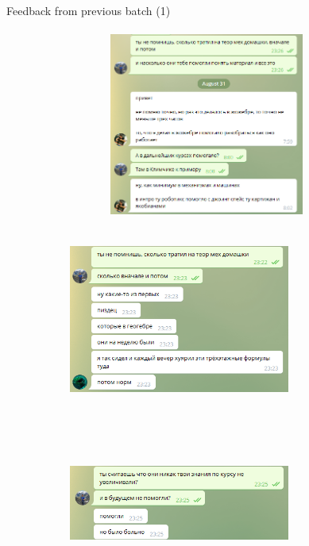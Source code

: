 \documentclass[aspectratio=169,xcolor=table,10pt, notes=hide]{beamer}
\begin{document}
\begin{frame}[t]{Feedback from previous batch (1)
    }
    \framesubtitle{}
    \begin{figure}[H]
        \begin{subfigure}[b]{0.49\textwidth}
            \centering\includegraphics[height=6cm,width=1\textwidth,keepaspectratio]{image14.png}
        \end{subfigure}
        \begin{subfigure}[b]{0.49\textwidth}
            \centering\includegraphics[height=6cm,width=0.8\textwidth,keepaspectratio]{image19.png}
            \centering\includegraphics[height=6cm,width=0.8\textwidth,keepaspectratio]{image16.png}
        \end{subfigure}
    \end{figure}
\end{frame}
\end{document}
